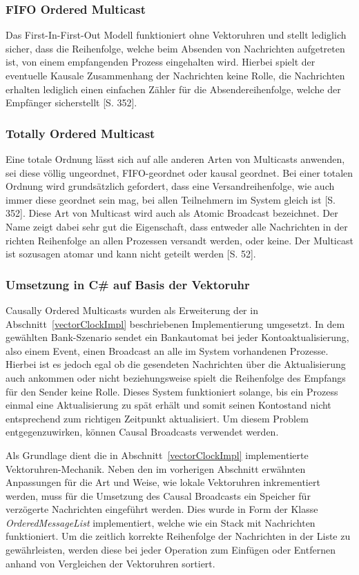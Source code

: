 \subsubsection*{FIFO Ordered Multicast}
Das First-In-First-Out Modell funktioniert ohne Vektoruhren und stellt lediglich sicher, dass die Reihenfolge, welche beim Absenden von Nachrichten aufgetreten ist, von einem empfangenden Prozess eingehalten wird. Hierbei spielt der eventuelle Kausale Zusammenhang der Nachrichten keine Rolle, die Nachrichten erhalten lediglich einen einfachen Zähler für die Absendereihenfolge, welche der Empfänger sicherstellt \cite{Tanenbaum2007}[S. 352].

\subsubsection*{Totally Ordered Multicast}
Eine totale Ordnung lässt sich auf alle anderen Arten von Multicasts anwenden, sei diese völlig ungeordnet, FIFO-geordnet oder kausal geordnet. Bei einer totalen Ordnung wird grundsätzlich gefordert, dass eine Versandreihenfolge, wie auch immer diese geordnet sein mag, bei allen Teilnehmern im System gleich ist \cite{Tanenbaum2007}[S. 352]. Diese Art von Multicast wird auch als Atomic Broadcast bezeichnet. Der Name zeigt dabei sehr gut die Eigenschaft, dass entweder alle Nachrichten in der richten Reihenfolge an allen Prozessen versandt werden, oder keine. Der Multicast ist sozusagen atomar und kann nicht geteilt werden \cite{Birman:1987:RCP:7351.7478}[S. 52].

\subsubsection{Umsetzung in C\# auf Basis der Vektoruhr}
Causally Ordered Multicasts wurden als Erweiterung der in Abschnitt~\ref{vectorClockImpl} beschriebenen Implementierung umgesetzt. In dem gewählten Bank-Szenario sendet ein Bankautomat bei jeder Kontoaktualisierung, also einem Event, einen Broadcast an alle im System vorhandenen Prozesse. Hierbei ist es jedoch egal ob die gesendeten Nachrichten über die Aktualisierung auch ankommen oder nicht beziehungsweise spielt die Reihenfolge des Empfangs für den Sender keine Rolle. Dieses System funktioniert solange, bis ein Prozess einmal eine Aktualisierung zu spät erhält und somit seinen Kontostand nicht entsprechend zum richtigen Zeitpunkt aktualisiert. Um diesem Problem entgegenzuwirken, können Causal Broadcasts verwendet werden.

Als Grundlage dient die in Abschnitt~\ref{vectorClockImpl} implementierte Vektoruhren-Mechanik. Neben den im vorherigen Abschnitt erwähnten Anpassungen für die Art und Weise, wie lokale Vektoruhren inkrementiert werden, muss für die Umsetzung des Causal Broadcasts ein Speicher für verzögerte Nachrichten eingeführt werden. Dies wurde in Form der Klasse \textit{OrderedMessageList} implementiert, welche wie ein Stack mit Nachrichten funktioniert. Um die zeitlich korrekte Reihenfolge der Nachrichten in der Liste zu gewährleisten, werden diese bei jeder Operation zum Einfügen oder Entfernen anhand von Vergleichen der Vektoruhren sortiert. 

